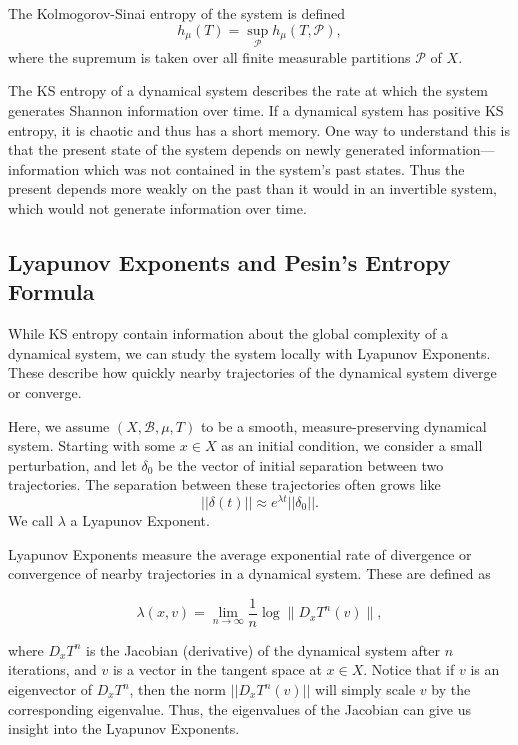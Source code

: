 \documentclass{article}
\begin{document}

The Kolmogorov-Sinai entropy of the system is defined
\[
h_\mu(T) = \sup_{\mathcal{P}} h_\mu(T, \mathcal{P}),
\]
where the supremum is taken over all finite measurable partitions \(\mathcal{P}\) of \(X\).

The KS entropy of a dynamical system describes the rate at which the system generates Shannon information over time. If a dynamical system has positive KS entropy, it is chaotic and thus has a short memory. One way to understand this is that the present state of the system depends on newly generated information––information which was not contained in the system's past states. Thus the present depends more weakly on the past than it would in an invertible system, which would not generate information over time. 

\subsection{Lyapunov Exponents and Pesin's Entropy Formula}


While KS entropy contain information about the global complexity of a dynamical system, we can study the system locally with Lyapunov Exponents. These describe how quickly nearby trajectories of the dynamical system diverge or converge.

Here, we assume $(X, \mathcal{B}, \mu, T)$ to be a smooth, measure-preserving dynamical system. Starting with some $x\in X$ as an initial condition, we consider a small perturbation, and let $\delta_0$ be the vector of initial separation between two trajectories. The separation between these trajectories often grows like \[||\delta(t)||\approx e^{\lambda t}||\delta_0||.\]
We call $\lambda$ a Lyapunov Exponent.

Lyapunov Exponents measure the average exponential rate of divergence or convergence of nearby trajectories in a dynamical system. These are defined as

\[ \lambda(x, v) = \lim_{n \to \infty} \frac{1}{n} \log \| D_xT^n(v) \|, \]

where $D_xT^n$ is the Jacobian (derivative) of the dynamical system after $n$ iterations, and $v$ is a vector in the tangent space at $x\in X$. Notice that if $v$ is an eigenvector of $D_xT^n$, then the norm $||D_xT^n(v)||$ will simply scale $v$ by the corresponding eigenvalue. Thus, the eigenvalues of the Jacobian can give us insight into the Lyapunov Exponents. 
\end{document}
